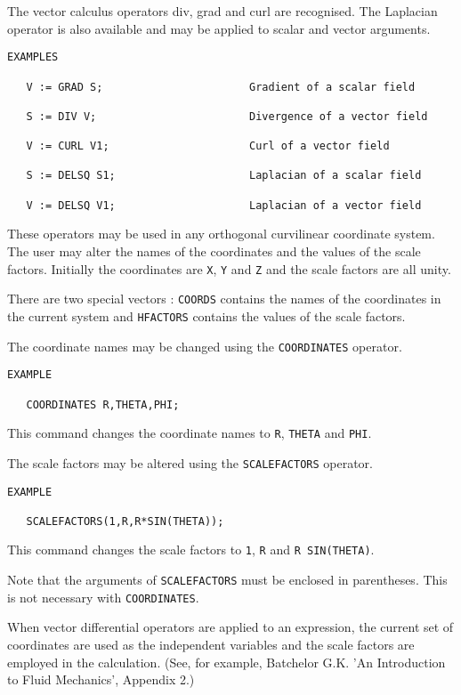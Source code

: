 The vector calculus operators div, grad and curl are recognised.
The Laplacian operator is also available and may be applied to
scalar and vector arguments.
\begin{verbatim}
EXAMPLES

   V := GRAD S;                       Gradient of a scalar field

   S := DIV V;                        Divergence of a vector field

   V := CURL V1;                      Curl of a vector field

   S := DELSQ S1;                     Laplacian of a scalar field

   V := DELSQ V1;                     Laplacian of a vector field
\end{verbatim}

These operators may be used in any orthogonal curvilinear coordinate
system. The user may alter the names of the coordinates and the values
of the scale factors. Initially the coordinates are {\tt X}, {\tt Y}
and {\tt Z} and the scale factors are all unity.

There are two special vectors : {\tt COORDS} contains the names
of the coordinates in the current system and {\tt HFACTORS}
contains the values of the scale factors.

The coordinate names may be changed using the {\tt COORDINATES}
operator.
\begin{verbatim}
EXAMPLE

   COORDINATES R,THETA,PHI;
\end{verbatim}
This command changes the coordinate names to {\tt R}, {\tt THETA} and
{\tt PHI}.

The scale factors may be altered using the {\tt SCALEFACTORS} operator.
\begin{verbatim}
EXAMPLE

   SCALEFACTORS(1,R,R*SIN(THETA));
\end{verbatim}
This command changes the scale factors to {\tt 1}, {\tt R} and {\tt R
SIN(THETA)}.

Note that the arguments of {\tt SCALEFACTORS} must be enclosed in
parentheses. This is not necessary with {\tt COORDINATES}.


When vector differential operators are applied to an expression,
the current set of coordinates are used as the independent
variables and the scale factors are employed in the calculation.
(See, for example, Batchelor G.K. 'An Introduction to Fluid
Mechanics', Appendix 2.)


